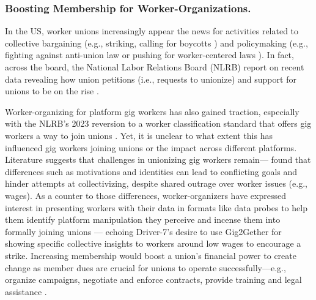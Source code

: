 {%


\subsubsection{Boosting Membership for Worker-Organizations.}
In the US, worker unions increasingly appear the news for activities related to collective bargaining (e.g., striking, calling for boycotts \cite{Yamat_2024, Robertson_2024, Reuters2024vw}) and policymaking (e.g., fighting against anti-union law or pushing for worker-centered laws \cite{Quinlan_2024a}). In fact, across the board, the National Labor Relations Board (NLRB) report on recent data revealing how union petitions (i.e., requests to unionize) and support for unions to be on the rise \cite{NLRB_2024}.

Worker-organizing for platform gig workers has also gained traction, especially with the NLRB's 2023 reversion to a worker classification standard that offers gig workers a way to join unions \cite{Cockayne_2023}. Yet, it is unclear to what extent this has influenced gig workers joining unions or the impact across different platforms. Literature suggests that challenges in unionizing gig workers remain---\citet{schou2023divided} found that differences such as motivations and identities can lead to conflicting goals and hinder attempts at collectivizing, despite shared outrage over worker issues (e.g., wages). As a counter to those differences, worker-organizers have expressed interest in presenting workers with their data in formats like data probes to help them identify platform manipulation they perceive and incense them into formally joining unions \cite{policy_probes} --- echoing Driver-7's desire to use Gig2Gether for showing specific collective insights to workers around low wages to encourage a strike. Increasing membership would boost a union's financial power to create change as member dues are crucial for unions to operate successfully---e.g., organize campaigns, negotiate and enforce contracts, provide training and legal assistance \cite{UnionCoded_2023}. 
}